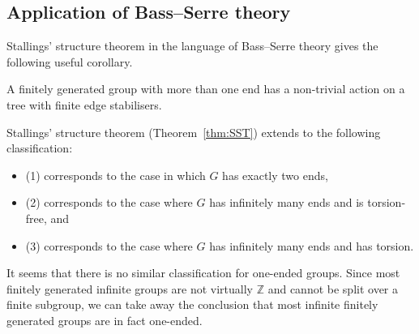 \subsection{Application of Bass--Serre theory}

Stallings' structure theorem in the language of Bass--Serre theory gives the following useful corollary. 
\begin{corollary}
    A finitely generated group with more than one end has a non-trivial action on a tree with finite edge stabilisers.
\end{corollary}

\begin{theorem}
    Stallings' structure theorem (Theorem~\ref{thm:SST}) extends to the following classification: 
    \begin{itemize}
        \item (1) corresponds to the case in which \(G\) has exactly two ends,
        \item (2) corresponds to the case where \(G\) has infinitely many ends and is torsion-free, and
        \item (3) corresponds to the case where \(G\) has infinitely many ends and has torsion.
    \end{itemize}
\end{theorem}

It seems that there is no similar classification for one-ended groups. Since most finitely generated infinite groups are not virtually \(\mathbb{Z}\) and cannot be split over a finite subgroup, we can take away the conclusion that most infinite finitely generated groups are in fact one-ended.

